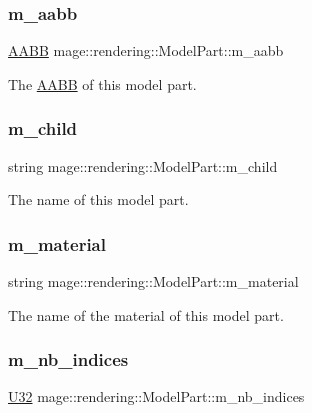 \subsubsection{\texorpdfstring{m\+\_\+aabb}{m\_aabb}}
{\footnotesize\ttfamily \hyperlink{classmage_1_1_a_a_b_b}{A\+A\+BB} mage\+::rendering\+::\+Model\+Part\+::m\+\_\+aabb}

The \hyperlink{classmage_1_1_a_a_b_b}{A\+A\+BB} of this model part. \hypertarget{structmage_1_1rendering_1_1_model_part_ad2eb9ff5aaeecf676b54a1e2d7231ee8}{}\label{structmage_1_1rendering_1_1_model_part_ad2eb9ff5aaeecf676b54a1e2d7231ee8} 
\subsubsection{\texorpdfstring{m\+\_\+child}{m\_child}}
{\footnotesize\ttfamily string mage\+::rendering\+::\+Model\+Part\+::m\+\_\+child}

The name of this model part. \hypertarget{structmage_1_1rendering_1_1_model_part_a1b2b0bf7c9acc87fc1673aac67a1849b}{}\label{structmage_1_1rendering_1_1_model_part_a1b2b0bf7c9acc87fc1673aac67a1849b} 
\subsubsection{\texorpdfstring{m\+\_\+material}{m\_material}}
{\footnotesize\ttfamily string mage\+::rendering\+::\+Model\+Part\+::m\+\_\+material}

The name of the material of this model part. \hypertarget{structmage_1_1rendering_1_1_model_part_a6e622f4bcb1ada388c3ee489c22e4547}{}\label{structmage_1_1rendering_1_1_model_part_a6e622f4bcb1ada388c3ee489c22e4547} 
\subsubsection{\texorpdfstring{m\+\_\+nb\+\_\+indices}{m\_nb\_indices}}
{\footnotesize\ttfamily \hyperlink{namespacemage_a41c104c036fba3756a74e19f793eeaa1}{U32} mage\+::rendering\+::\+Model\+Part\+::m\+\_\+nb\+\_\+indices}


